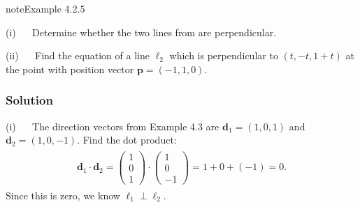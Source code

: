 \documentclass[letterpaper,10pt,english]{jupyterBook}
\begin{document}
\begin{sphinxadmonition}{note}{Example 4.2.5}



\sphinxAtStartPar
(i)   Determine whether the two lines from {\hyperref[\detokenize{_pages/4.1_Lines:parallel-lines-example}]{}} are perpendicular.

\sphinxAtStartPar
(ii)   Find the equation of a line \(\ell_2\) which is perpendicular to \((t,-t,1+t)\) at the point with position vector \(\mathbf{p} = (-1,1,0)\).
\subsubsection*{Solution}

\sphinxAtStartPar
(i)   The direction vectors from Example 4.3 are \(\mathbf{d}_1 = (1, 0, 1)\) and \(\mathbf{d}_2 = (1, 0, -1)\). Find the dot product:
\begin{equation*}
\begin{split} \begin{align*}
    \mathbf{d}_1 \cdot \mathbf{d}_2 = \begin{pmatrix} 1 \\ 0 \\ 1 \end{pmatrix} \cdot
    \begin{pmatrix} 1 \\ 0 \\ -1 \end{pmatrix} = 1 + 0 + (-1) = 0.
\end{align*} \end{split}
\end{equation*}
\sphinxAtStartPar
Since this is zero, we know \(\ell_1 \perp \ell_2\).


\end{sphinxadmonition}
\end{document}
